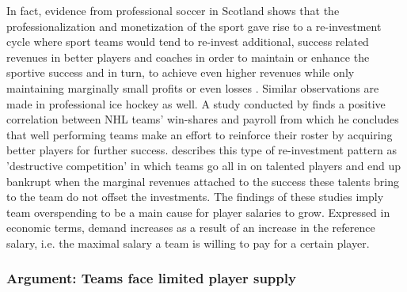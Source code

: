 \documentclass[12pt,a4paper]{article}\usepackage[]{graphicx}\usepackage[]{xcolor}
\begin{document}
\par
\noindent
In fact, evidence from professional soccer in Scotland shows that the professionalization and monetization of the sport gave rise to a re-investment cycle where sport teams would tend to re-invest additional, success related revenues in better players and coaches in order to maintain or enhance the sportive success and in turn, to achieve even higher revenues while only maintaining marginally small profits or even losses \citep{cooper_insolvency_2013}. Similar observations are made in professional ice hockey as well. A study conducted by \citet{zimbalist_competitive_2002} finds a positive correlation between NHL teams' win-shares and payroll from which he concludes that well performing teams make an effort to reinforce their roster by acquiring better players for further success. \citet{whitney_bidding_1993} describes this type of re-investment pattern as 'destructive competition' in which teams go all in on talented players and end up bankrupt when the marginal revenues attached to the success these talents bring to the team do not offset the investments. The findings of these studies imply team overspending to be a main cause for player salaries to grow. Expressed in economic terms, demand increases as a result of an increase in the reference salary, i.e. the maximal salary a team is willing to pay for a certain player. 


\subsubsection{Argument: Teams face limited player supply}
\end{document}
